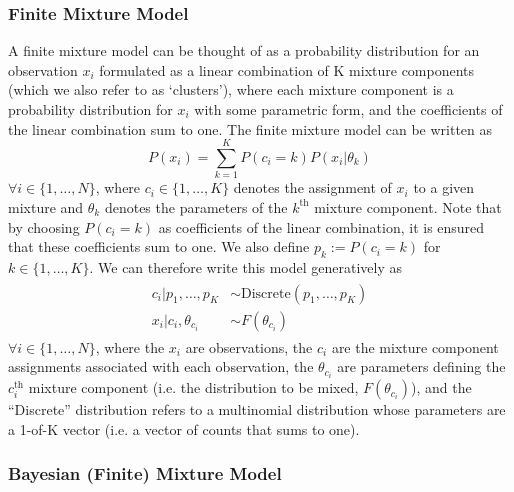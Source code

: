 \documentclass[smallcondensed, final]{svjour3}
\begin{document}

\subsubsection{Finite Mixture Model}
\label{sec:finite_mixture}

A finite mixture model can be thought of as a probability distribution for an observation $x_{i}$ formulated as a linear combination of K mixture components (which we also refer to as `clusters'), where each mixture component is a probability distribution for $x_{i}$ with some parametric form, and the coefficients of the linear combination sum to one. The finite mixture model can be written as
\begin{equation}
P(x_{i}) = \sum_{k=1}^{K} P(c_{i} = k)P(x_{i}|\theta_{k})
\end{equation}
$\forall i \in \{ 1, \ldots, N \}$, where $c_{i} \in \{ 1, \ldots, K \}$ denotes the assignment of $x_{i}$ to a given mixture and $\theta_{k}$ denotes the parameters of the $k^{\text{th}}$ mixture component. Note that by choosing $P(c_{i} = k)$ as coefficients of the linear combination, it is ensured that these coefficients sum to one. We also define $p_{k} := P(c_{i} = k)$ for $k \in \{ 1, \ldots, K \} $. We can therefore write this model generatively as
\begin{align}
\begin{split}
	c_{i}|p_{1}, \ldots, p_{K}  &\sim  \text{Discrete}(p_{1}, \ldots, p_{K}) \\
	x_{i}|c_{i}, \theta_{c_{i}}  &\sim  F(\theta_{c_{i}})
\end{split}
\end{align}
$\forall i \in \{ 1, \ldots, N \}$, where the $x_{i}$ are observations, the $c_{i}$ are the mixture component assignments associated with each observation, the $\theta_{c_{i}}$ are parameters defining the $c_{i}^{\text{th}}$ mixture component (i.e. the distribution to be mixed, $F(\theta_{c_{i}})$), and the ``Discrete'' distribution refers to a multinomial distribution whose parameters are a 1-of-K vector (i.e. a vector of counts that sums to one).






\subsubsection{Bayesian (Finite) Mixture Model}
\label{sec:bayesian_mixture}
\end{document}
